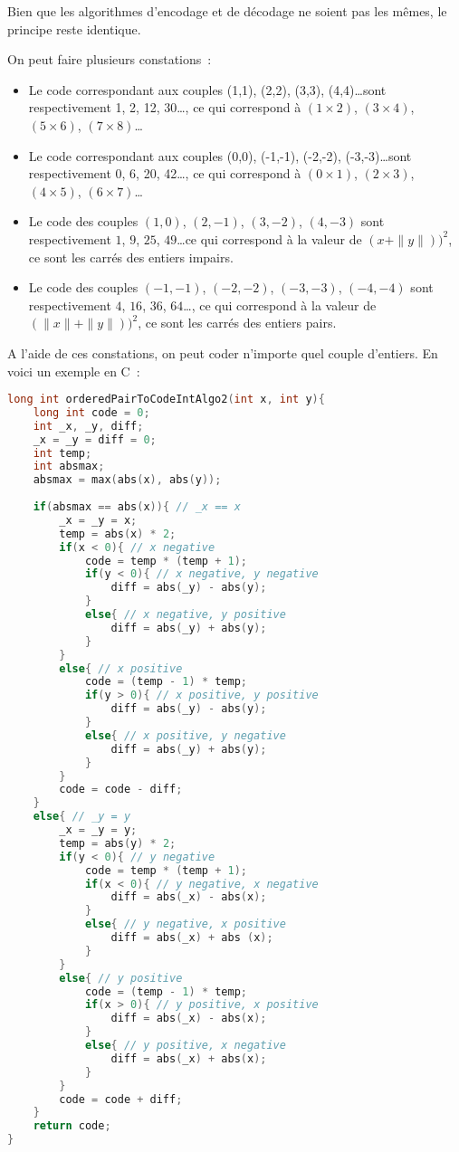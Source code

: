 \documentclass{article}
\begin{document}
Bien que les algorithmes d'encodage et de décodage ne soient pas les mêmes, le principe reste identique. 

On peut faire plusieurs constations~:



\begin{itemize}
\item Le code correspondant aux couples (1,1), (2,2), (3,3), (4,4)\ldots sont respectivement 1, 2, 12, 30\ldots, ce qui correspond à $(1 \times 2)$, $(3 \times 4)$, $(5 \times 6)$, $(7 \times 8)$\ldots
\item Le code correspondant aux couples (0,0), (-1,-1), (-2,-2), (-3,-3)\ldots sont respectivement 0, 6, 20, 42\ldots, ce qui correspond à $(0 \times 1)$, $(2 \times 3)$, $(4 \times 5)$, $(6 \times 7)$\ldots
\item Le code des couples $(1,0)$, $(2,-1)$, $(3,-2)$, $(4,-3)$ sont respectivement $1$, $9$, $25$, $49$\ldots ce qui correspond à la valeur de $(x + \|y\|))^{2}$, ce sont les carrés des entiers impairs.
\item Le code des couples $(-1,-1)$, $(-2,-2)$, $(-3,-3)$, $(-4,-4)$ sont respectivement $4$, $16$, $36$, $64$\ldots,  ce qui correspond à la valeur de $(\|x\| + \|y\|))^{2}$, ce sont les carrés des entiers pairs.
\end{itemize}


A l'aide de ces constations, on peut coder n'importe quel couple d'entiers. En voici un exemple en C~:


\begin{lstlisting}[language=C]
long int orderedPairToCodeIntAlgo2(int x, int y){
	long int code = 0;
	int _x, _y, diff;
	_x = _y = diff = 0;
	int temp;
	int absmax;	
	absmax = max(abs(x), abs(y));	
	
	if(absmax == abs(x)){ // _x == x 
		_x = _y = x;
		temp = abs(x) * 2;
		if(x < 0){ // x negative
			code = temp * (temp + 1);
			if(y < 0){ // x negative, y negative
				diff = abs(_y) - abs(y);
			}
			else{ // x negative, y positive
				diff = abs(_y) + abs(y);
			}
		}
		else{ // x positive
			code = (temp - 1) * temp; 
			if(y > 0){ // x positive, y positive
				diff = abs(_y) - abs(y);
			}
			else{ // x positive, y negative
				diff = abs(_y) + abs(y);
			}
		}
		code = code - diff;
	}
	else{ // _y = y
		_x = _y = y;
		temp = abs(y) * 2;
		if(y < 0){ // y negative
			code = temp * (temp + 1);		
			if(x < 0){ // y negative, x negative
				diff = abs(_x) - abs(x);
			}
			else{ // y negative, x positive
				diff = abs(_x) + abs (x);
			}
		}
		else{ // y positive
			code = (temp - 1) * temp;
			if(x > 0){ // y positive, x positive
				diff = abs(_x) - abs(x);
			}
			else{ // y positive, x negative
				diff = abs(_x) + abs(x);
			}	
		}	
		code = code + diff;	
	}
	return code;
}
\end{lstlisting}
\end{document}

